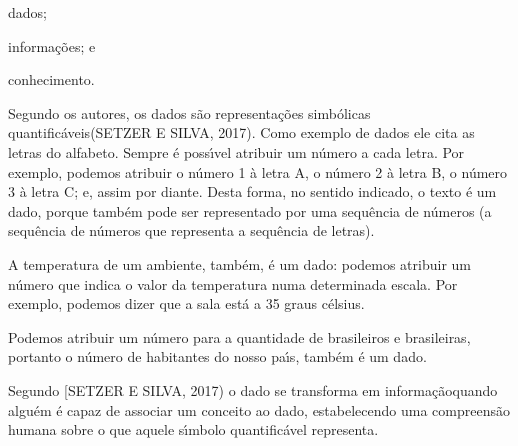 \documentclass[
12pt,		%
openright,	%
twoside,  %
a4paper,			%
chapter=TITLE,		%
english,			%
french,				%
spanish,			%
brazil				%
]{USPSC-classe/USPSC}
\begin{document}
\begin{alineas}
\item dados;
\item informa\c{c}\~oes; e
\item conhecimento.
\end{alineas}

Segundo os autores, os \textquotedbl  dados \textquotedbl  s\~ao \textquotedbl representa\c{c}\~oes simb\'olicas quantific\'aveis\textquotedbl  (SETZER E SILVA, 2017). Como exemplo de dados ele cita as letras do alfabeto. Sempre \'e poss\'{\i}vel atribuir um n\'umero a cada letra. Por exemplo, podemos atribuir o n\'umero 1 \`a letra A, o n\'umero 2 \`a letra B, o n\'umero 3 \`a letra C; e, assim por diante. Desta forma, no sentido indicado, o texto \'e um dado, porque tamb\'em pode ser representado por uma sequ\^encia de n\'umeros (a sequ\^encia de n\'umeros que representa a sequ\^encia de letras).

















A temperatura de um ambiente, tamb\'em, \'e um dado: podemos atribuir um n\'umero que indica o valor da temperatura numa determinada escala. Por exemplo, podemos dizer que a sala \textquotedbl est\'a a 35 graus c\'elsius\textquotedbl .

















Podemos atribuir um n\'umero para a quantidade de brasileiros e brasileiras, portanto o n\'umero de habitantes do nosso pa\'{\i}s, tamb\'em \'e um dado.

















Segundo [SETZER E SILVA, 2017) o dado se transforma em \textquotedbl informa\c{c}\~ao\textquotedbl  quando algu\'em \'e capaz de associar um conceito ao dado, estabelecendo uma compreens\~ao humana sobre o que aquele s\'{\i}mbolo quantific\'avel representa.
\end{document}
